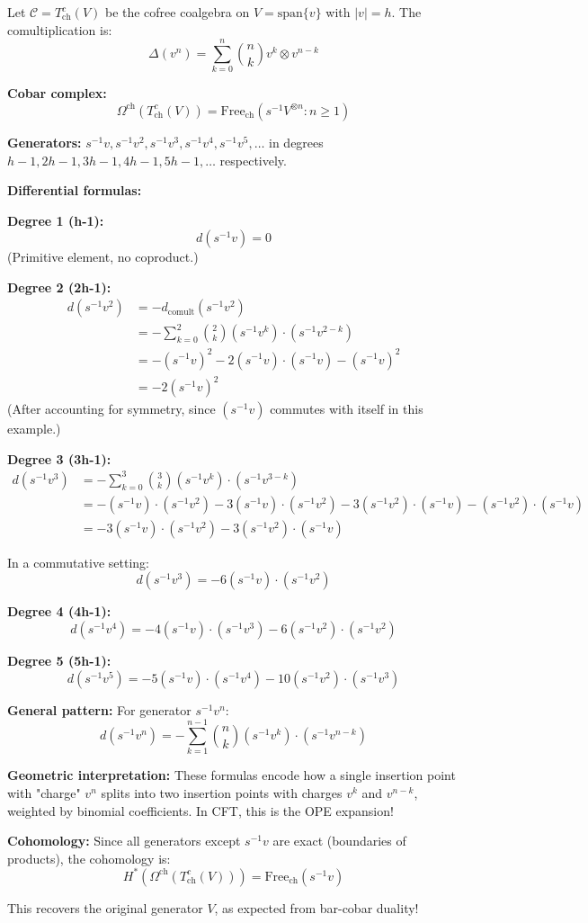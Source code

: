 \begin{example}
\label{ex:cobar-linear-complete}

Let $\mathcal{C} = T^c_{\text{ch}}(V)$ be the cofree coalgebra on $V = \text{span}\{v\}$ 
with $|v| = h$. The comultiplication is:
$$\Delta(v^n) = \sum_{k=0}^n \binom{n}{k} v^k \otimes v^{n-k}$$

\textbf{Cobar complex:}
$$\Omega^{\text{ch}}(T^c_{\text{ch}}(V)) = \text{Free}_{\text{ch}}(s^{-1}V^{\otimes n} 
: n \geq 1)$$

\textbf{Generators:} $s^{-1}v, s^{-1}v^2, s^{-1}v^3, s^{-1}v^4, s^{-1}v^5, \ldots$ 
in degrees $h-1, 2h-1, 3h-1, 4h-1, 5h-1, \ldots$ respectively.

\textbf{Differential formulas:}

\textbf{Degree 1 (h-1):}
$$d(s^{-1}v) = 0$$
(Primitive element, no coproduct.)

\textbf{Degree 2 (2h-1):}
\begin{align*}
d(s^{-1}v^2) &= -d_{\text{comult}}(s^{-1}v^2) \\
&= -\sum_{k=0}^2 \binom{2}{k} (s^{-1}v^k) \cdot (s^{-1}v^{2-k}) \\
&= -(s^{-1}v)^2 - 2(s^{-1}v) \cdot (s^{-1}v) - (s^{-1}v)^2 \\
&= -2(s^{-1}v)^2
\end{align*}
(After accounting for symmetry, since $(s^{-1}v)$ commutes with itself in this example.)

\textbf{Degree 3 (3h-1):}
\begin{align*}
d(s^{-1}v^3) &= -\sum_{k=0}^3 \binom{3}{k} (s^{-1}v^k) \cdot (s^{-1}v^{3-k}) \\
&= -(s^{-1}v) \cdot (s^{-1}v^2) - 3(s^{-1}v) \cdot (s^{-1}v^2) - 3(s^{-1}v^2) \cdot 
(s^{-1}v) - (s^{-1}v^2) \cdot (s^{-1}v) \\
&= -3(s^{-1}v) \cdot (s^{-1}v^2) - 3(s^{-1}v^2) \cdot (s^{-1}v)
\end{align*}

In a commutative setting:
$$d(s^{-1}v^3) = -6(s^{-1}v) \cdot (s^{-1}v^2)$$

\textbf{Degree 4 (4h-1):}
$$d(s^{-1}v^4) = -4(s^{-1}v) \cdot (s^{-1}v^3) - 6(s^{-1}v^2) \cdot (s^{-1}v^2)$$

\textbf{Degree 5 (5h-1):}
$$d(s^{-1}v^5) = -5(s^{-1}v) \cdot (s^{-1}v^4) - 10(s^{-1}v^2) \cdot (s^{-1}v^3)$$

\textbf{General pattern:} For generator $s^{-1}v^n$:
$$d(s^{-1}v^n) = -\sum_{k=1}^{n-1} \binom{n}{k} (s^{-1}v^k) \cdot (s^{-1}v^{n-k})$$

\textbf{Geometric interpretation:} These formulas encode how a single insertion 
point with "charge" $v^n$ splits into two insertion points with charges $v^k$ and 
$v^{n-k}$, weighted by binomial coefficients. In CFT, this is the OPE expansion!

\textbf{Cohomology:} Since all generators except $s^{-1}v$ are exact (boundaries 
of products), the cohomology is:
$$H^*(\Omega^{\text{ch}}(T^c_{\text{ch}}(V))) = \text{Free}_{\text{ch}}(s^{-1}v)$$

This recovers the original generator $V$, as expected from bar-cobar duality!
\end{example}

